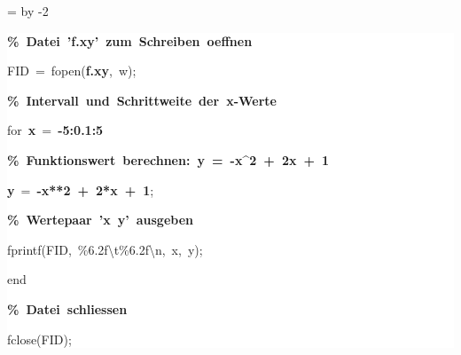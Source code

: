 \begingroup
\ttfamily
{}
=\textwidth
\advance{} by -2\fboxsep
\noindent
\colorbox{background}
{%
\parbox{\dimen255}
{%
\rule[-0.5ex]{0pt}{2.5ex}\hspace*{0.0em}\textcolor{G}{\textbf{\%~Datei~'f.xy'~zum~Schreiben~oeffnen}}\\
\rule[-0.5ex]{0pt}{2.5ex}\hspace*{0.0em}FID~=~fopen(\grqq{}\textcolor{B}{\textbf{f.xy}}\grqq{},~\grqq{}w\grqq{});\\
\rule[-0.5ex]{0pt}{2.5ex}\hspace*{0.0em}\textcolor{G}{\textbf{\%~Intervall~und~Schrittweite~der~x{-}Werte}}\\
\rule[-0.5ex]{0pt}{2.5ex}\hspace*{0.0em}for~\textcolor{R}{\textbf{x}}~=~\textcolor{R}{\textbf{{-}5:0.1:5}}\\
\rule[-0.5ex]{0pt}{2.5ex}\hspace*{1.0em}\textcolor{G}{\textbf{\%~Funktionswert~berechnen:~y~=~{-}x\^{}2~+~2x~+~1}}\\
\rule[-0.5ex]{0pt}{2.5ex}\hspace*{1.0em}\textcolor{R}{\textbf{y}}~=~\textcolor{R}{\textbf{{-}x**2~+~2*x~+~1}};\\
\rule[-0.5ex]{0pt}{2.5ex}\hspace*{1.0em}\textcolor{G}{\textbf{\%~Wertepaar~'x~y'~ausgeben}}\\
\rule[-0.5ex]{0pt}{2.5ex}\hspace*{1.0em}fprintf(FID,~\grqq{}\%6.2f\textbackslash{}t\%6.2f\textbackslash{}n\grqq{},~x,~y);\\
\rule[-0.5ex]{0pt}{2.5ex}\hspace*{0.0em}end\\
\rule[-0.5ex]{0pt}{2.5ex}\hspace*{0.0em}\textcolor{G}{\textbf{\%~Datei~schliessen}}\\
\rule[-0.5ex]{0pt}{2.5ex}\hspace*{0.0em}fclose(FID);}%
}%
\endgroup
